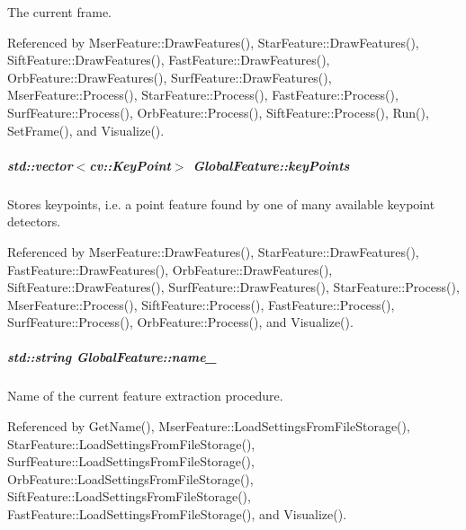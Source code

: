 The current frame. 



Referenced by Mser\-Feature\-::\-Draw\-Features(), Star\-Feature\-::\-Draw\-Features(), Sift\-Feature\-::\-Draw\-Features(), Fast\-Feature\-::\-Draw\-Features(), Orb\-Feature\-::\-Draw\-Features(), Surf\-Feature\-::\-Draw\-Features(), Mser\-Feature\-::\-Process(), Star\-Feature\-::\-Process(), Fast\-Feature\-::\-Process(), Surf\-Feature\-::\-Process(), Orb\-Feature\-::\-Process(), Sift\-Feature\-::\-Process(), Run(), Set\-Frame(), and Visualize().

\hypertarget{group___feature_extractor_a72cc606c0090a64718a7e92bca7520b9}{
\subparagraph[{key\-Points}]{\setlength{\rightskip}{0pt plus 5cm}std\-::vector$<$cv\-::\-Key\-Point$>$ Global\-Feature\-::key\-Points}}\label{group___feature_extractor_a72cc606c0090a64718a7e92bca7520b9}


Stores keypoints, i.\-e. a point feature found by one of many available keypoint detectors. 



Referenced by Mser\-Feature\-::\-Draw\-Features(), Star\-Feature\-::\-Draw\-Features(), Fast\-Feature\-::\-Draw\-Features(), Orb\-Feature\-::\-Draw\-Features(), Sift\-Feature\-::\-Draw\-Features(), Surf\-Feature\-::\-Draw\-Features(), Star\-Feature\-::\-Process(), Mser\-Feature\-::\-Process(), Sift\-Feature\-::\-Process(), Fast\-Feature\-::\-Process(), Surf\-Feature\-::\-Process(), Orb\-Feature\-::\-Process(), and Visualize().

\hypertarget{group___feature_extractor_abee52be830de272bd27685083bf28aae}{
\subparagraph[{name\-\_\-}]{\setlength{\rightskip}{0pt plus 5cm}std\-::string Global\-Feature\-::name\-\_\-\hspace{0.3cm}{\ttfamily [protected]}}}\label{group___feature_extractor_abee52be830de272bd27685083bf28aae}


Name of the current feature extraction procedure. 



Referenced by Get\-Name(), Mser\-Feature\-::\-Load\-Settings\-From\-File\-Storage(), Star\-Feature\-::\-Load\-Settings\-From\-File\-Storage(), Surf\-Feature\-::\-Load\-Settings\-From\-File\-Storage(), Orb\-Feature\-::\-Load\-Settings\-From\-File\-Storage(), Sift\-Feature\-::\-Load\-Settings\-From\-File\-Storage(), Fast\-Feature\-::\-Load\-Settings\-From\-File\-Storage(), and Visualize().

